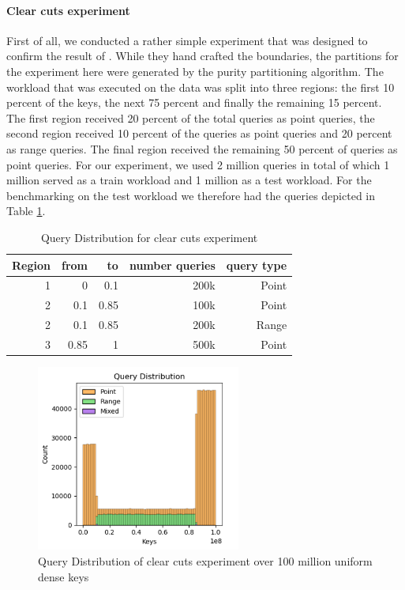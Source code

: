 \paragraph{Clear cuts experiment}

First of all, we conducted a rather simple experiment that was designed to confirm the result of \citeauthor{Dittrich2021} \cite{Dittrich2021}. While they hand crafted the boundaries, the partitions for the experiment here were generated by the purity partitioning algorithm. The workload that was executed on the data was split into three regions: the first 10 percent of the keys, the next 75 percent and finally the remaining 15 percent. The first region received 20 percent of the total queries as point queries, the second region received 10 percent of the queries as point queries and 20 percent as range queries. The final region received the remaining 50 percent of queries as point queries. For our experiment, we used 2 million queries in total of which 1 million served as a train workload and 1 million as a test workload. For the benchmarking on the test workload we therefore had the queries depicted in Table \ref{tab:poc_wkl}.

\begin{table}[H]
\centering
\begin{tabular}{rrrrr}
\hline
Region & from & to   & number queries & query type \\ \hline
1      & 0    & 0.1  & 200k           & Point      \\
2      & 0.1  & 0.85 & 100k           & Point      \\
2      & 0.1  & 0.85 & 200k           & Range      \\
3      & 0.85 & 1    & 500k           & Point      \\ \hline
\end{tabular}
\caption{Query Distribution for clear cuts experiment}
\label{tab:poc_wkl}
\end{table}

\begin{figure}[H]
    \centering
    \includegraphics[width=0.6\textwidth]{figures/poc_dist.png}
    \caption{Query Distribution of clear cuts experiment over 100 million uniform dense keys}
    \label{fig:poc_dist}
\end{figure}

